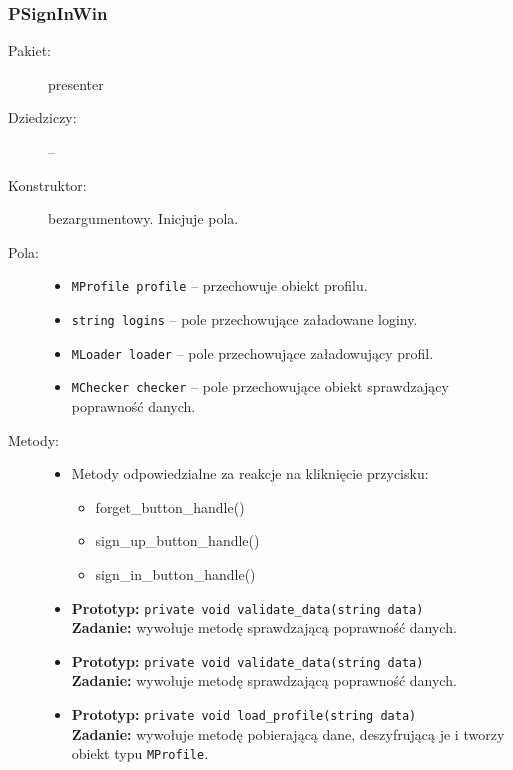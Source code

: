\documentclass[a4paper]{article}
\newcommand{\prog}{\texttt}
\begin{document}
\subsubsection{PSignInWin}
\begin{description}
    \item[Pakiet:] presenter
    \item[Dziedziczy:] --
    \item[Konstruktor:] bezargumentowy. Inicjuje pola.
    \item[Pola:] \hfill
    \begin{itemize}
        \item \prog{MProfile profile} -- przechowuje obiekt profilu.
        \item \prog{string logins} -- pole przechowujące załadowane loginy.
        \item \prog{MLoader loader} -- pole przechowujące załadowujący profil.
        \item \prog{MChecker checker} -- pole przechowujące obiekt sprawdzający poprawność danych.
    \end{itemize}
    \item[Metody:] \hfill
    \begin{itemize}
        \item Metody odpowiedzialne za reakcje na kliknięcie przycisku:
        \begin{itemize}
            \item forget\_button\_handle()
            \item sign\_up\_button\_handle()
            \item sign\_in\_button\_handle()
        \end{itemize}
        \item \textbf{Prototyp:} \prog{private void validate\_data(string data)}\\\textbf{Zadanie:} wywołuje metodę sprawdzającą poprawność danych.
        \item \textbf{Prototyp:} \prog{private void validate\_data(string data)}\\\textbf{Zadanie:} wywołuje metodę sprawdzającą poprawność danych.
        \item \textbf{Prototyp:} \prog{private void load\_profile(string data)}\\\textbf{Zadanie:} wywołuje metodę pobierającą dane, deszyfrującą je i tworzy obiekt typu \prog{MProfile}.
    \end{itemize}
\end{description}
\end{document}
